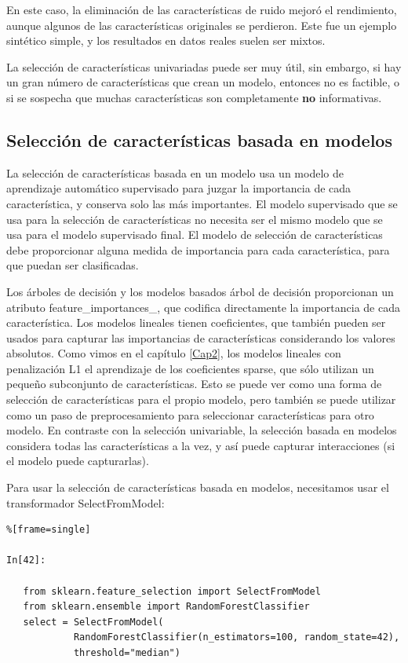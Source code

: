 En este caso, la eliminación de las características de ruido mejoró el rendimiento, aunque algunos
de las características originales se perdieron. Este fue un ejemplo sintético  simple, y los resultados en datos reales suelen ser mixtos.

La selección de características univariadas puede ser muy útil, sin embargo, si hay un gran número de características que crean un modelo,  entonces no es factible, o si se sospecha que muchas características  son completamente {\bf{no} } informativas.

\subsection{Selección de características basada en modelos}

 La selección de características basada en un  modelo usa un modelo de aprendizaje automático supervisado para juzgar la  importancia de cada característica, y conserva solo las más importantes. 
 El modelo supervisado  que se usa para la selección de características  no necesita ser el mismo modelo que se usa para el modelo supervisado final.   El modelo de selección de características debe proporcionar alguna medida de importancia para cada característica, para que puedan ser clasificadas.

 Los árboles de decisión y los modelos basados árbol de decisión proporcionan un atributo  {\ttfamily feature\_importances\_}, que codifica directamente la importancia de cada característica.   Los modelos lineales tienen coeficientes, que también  pueden ser usados  para capturar las importancias de características considerando los valores absolutos.   Como vimos en el capítulo \ref{Cap2}, los modelos lineales con penalización L1 el aprendizaje de los  coeficientes sparse, que sólo utilizan un pequeño subconjunto de características.   Esto se puede ver como una forma de selección de características para el propio modelo, pero también se puede utilizar como un paso de preprocesamiento para seleccionar características para otro modelo. 
 En contraste con la selección univariable, la selección basada en modelos considera todas las características a la vez, y así puede capturar interacciones (si el modelo puede capturarlas).
 
  Para usar la selección de características basada en modelos, necesitamos usar el transformador {\ttfamily SelectFromModel}:\\


\begin{lstlisting}%[frame=single]

In[42]:
 
   from sklearn.feature_selection import SelectFromModel
   from sklearn.ensemble import RandomForestClassifier
   select = SelectFromModel(
            RandomForestClassifier(n_estimators=100, random_state=42),
            threshold="median")
       
\end{lstlisting}

